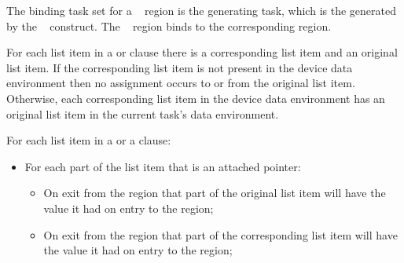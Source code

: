 \begin{samepage}

\binding
The binding task set for a ~ region is the
generating task, which is the  generated
by the ~ construct. The ~
region binds to the corresponding  region.

\descr
For each list item in a  or  clause there is a corresponding list item and an 
original list item. If the corresponding list item is not present in the device data environment then no assignment occurs to or from the original list item. Otherwise, each corresponding list item in the 
device data environment has an original list item in the current task's data environment.

%
%
%
%
%
%
%

For each list item in a  or a  clause: \begin{itemize}

    \item For each part of the list item that is an attached pointer:  \begin{itemize}

        \item On exit from the region that part of the original list item will
        have the value it had on entry to the region; 

        \item On exit from the region that part of the corresponding list item will
        have the value it had on entry to the region; 


\end{itemize}
\end{itemize}
\end{samepage}
